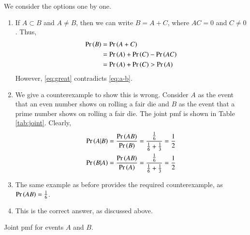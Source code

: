 \documentclass[journal,12pt,twocolumn]{IEEEtran}
\begin{document}
\begin{enumerate}
    We consider the options one by one.
    \begin{enumerate}
        \item If $A \subset B$ and $A \neq B$, then we can write $B = A+C$,
        where $AC = 0$ and $C \neq 0$. Thus,
        \begin{align}
            \Pr\left(B\right) &= \Pr\left(A+C\right) \\
                   &= \Pr\left(A\right)+\Pr\left(C\right)-\Pr\left(AC\right) \\
                   &= \Pr\left(A\right)+\Pr\left(C\right) > \Pr\left(A\right)
                   \label{eq:great}
        \end{align}
        However, \eqref{eq:great} contradicts \eqref{eq:a-b}.
        \item We give a counterexample to show this is wrong. Consider
        $A$ as the event that an even number shows on rolling a 
        fair die and $B$ as the event that a prime number shows on
        rolling a fair die. The joint pmf is shown in Table \ref{tab:joint}.
        Clearly,
        \begin{align}
            \Pr\left(A|B\right) &= \frac{\Pr\left(AB\right)}{\Pr\left(B\right)} = \frac{\frac{1}{6}}{\frac{1}{6}+\frac{1}{3}} = \frac{1}{2} \\
            \Pr\left(B|A\right) &= \frac{\Pr\left(AB\right)}{\Pr\left(A\right)} = \frac{\frac{1}{6}}{\frac{1}{6}+\frac{1}{3}} = \frac{1}{2}
        \end{align}
        \item The same example as before provides the required 
        counterexample, as $\Pr\left(AB\right) = \frac{1}{6}$.
        \item This is the correct answer, as discussed above.
    \end{enumerate}
    \begin{table}[!ht]
        \centering
        
        \caption{Joint pmf for events $A$ and $B$.}
        \label{tab:joint}
    \end{table}
\end{enumerate}
\end{document}
